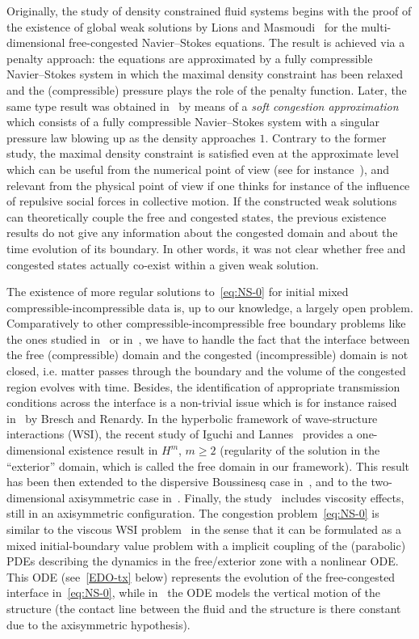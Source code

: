 \documentclass[AHL,Unicode,longabstracts,published]{cedram}
\begin{document}
Originally, the study of density constrained fluid systems begins with the proof of the existence of global weak solutions by Lions and Masmoudi~\cite{lions1999} for the multi-dimensional free-congested Navier--Stokes equations. The result is achieved via a penalty approach: the equations are approximated by a fully compressible Navier--Stokes system in which the maximal density constraint has been relaxed and the (compressible) pressure plays the role of the penalty function. Later, the same type result was obtained in~\cite{perrin2015} by means of a \emph{soft congestion approximation} which consists of a fully compressible Navier--Stokes system with a singular pressure law blowing up as the density approaches $1$. Contrary to the former study, the maximal density constraint is satisfied even at the approximate level which can be useful from the numerical point of view (see for instance~\cite{degond2011,PS}), and relevant from the physical point of view if one thinks for instance of the influence of repulsive social forces in collective motion. If the constructed weak solutions can theoretically couple the free and congested states, the previous existence results do not give any information about the congested domain and about the time evolution of its boundary. In other words, it was not clear whether free and congested states actually co-exist within a given weak solution.


The existence of more regular solutions to~\eqref{eq:NS-0} for initial mixed compressible-incompressible data is, up to our knowledge, a largely open problem. Comparatively to other compressible-incompressible free boundary problems like the ones studied in~\cite{shibata2016} or in~\cite{colombo2016}, we have to handle the fact that the interface between the free (compressible) domain and the congested (incompressible) domain is not closed, i.e. matter passes through the boundary and the volume of the congested region evolves with time. Besides, the identification of appropriate transmission conditions across the interface is a non-trivial issue which is for instance raised in~\cite{bresch2017} by Bresch and Renardy. In the hyperbolic framework of wave-structure interactions (WSI), the recent study of Iguchi and Lannes~\cite{iguchi2019} provides a one-dimensional existence result in $H^m$, $m \geq 2$ (regularity of the solution in the ``exterior'' domain, which is called the free domain in our framework). This result has been then extended to the dispersive Boussinesq case in~\cite{bresch2019,beck2021freely}, and to the two-dimensional axisymmetric case in~\cite{bocchi2020}. Finally, the study~\cite{maity2019} includes viscosity effects, still in an axisymmetric configuration. The congestion problem~\eqref{eq:NS-0} is similar to the viscous WSI problem~\cite{maity2019} in the sense that it can be formulated as a mixed initial-boundary value problem with a implicit coupling of the (parabolic) PDEs describing the dynamics in the free/exterior zone with a nonlinear ODE. This ODE (see~\eqref{EDO-tx} below) represents the evolution of the free-congested interface in~\eqref{eq:NS-0}, while in~\cite{maity2019} the ODE models the vertical motion of the structure (the contact line between the fluid and the structure is there constant due to the axisymmetric hypothesis).
\end{document}
